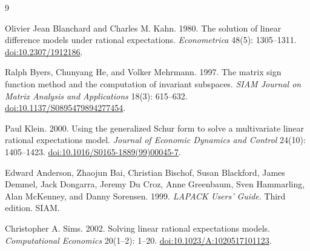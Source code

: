 \documentclass[11pt]{article}
\begin{document}
\begin{thebibliography}{9}

Olivier Jean Blanchard and Charles M. Kahn. 1980.
The solution of linear difference models under rational expectations.
\emph{Econometrica} 48(5): 1305--1311.
\href{https://doi.org/10.2307/1912186}{doi:10.2307/1912186}.

Ralph Byers, Chunyang He, and Volker Mehrmann. 1997.
The matrix sign function method and the computation of invariant subspaces.
\emph{SIAM Journal on Matrix Analysis and Applications} 18(3): 615--632.
\href{https://doi.org/10.1137/S0895479894277454}
{doi:10.1137/S0895479894277454}.

Paul Klein. 2000.
Using the generalized Schur form to solve a multivariate linear rational
expectations model.
\emph{Journal of Economic Dynamics and Control} 24(10): 1405--1423.
\href{https://doi.org/10.1016/S0165-1889(99)00045-7}
{doi:10.1016/S0165-1889(99)00045-7}.

Edward Anderson, Zhaojun Bai, Christian Bischof, Susan Blackford,
James Demmel, Jack Dongarra, Jeremy Du Croz, Anne Greenbaum,
Sven Hammarling, Alan McKenney, and Danny Sorensen. 1999.
\emph{LAPACK Users' Guide}. Third edition. SIAM.

Christopher A. Sims. 2002.
Solving linear rational expectations models.
\emph{Computational Economics} 20(1--2): 1--20.
\href{https://doi.org/10.1023/A:1020517101123}
{doi:10.1023/A:1020517101123}.

\end{thebibliography}
\end{document}
